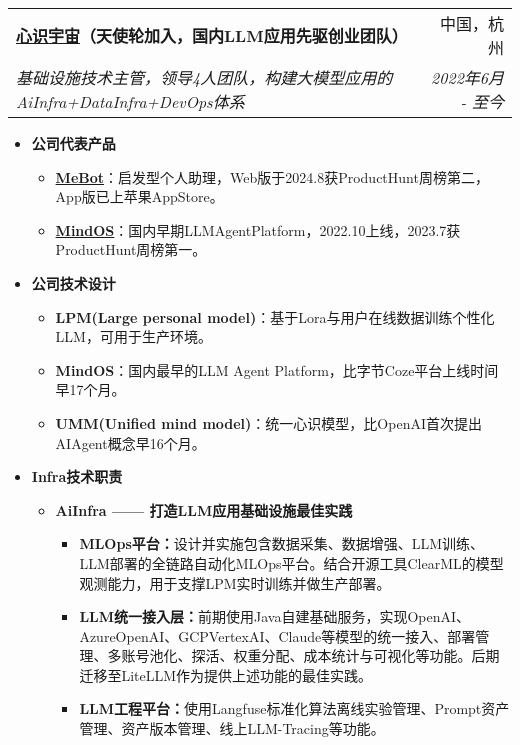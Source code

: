 \documentclass[letterpaper,11pt]{article}
\makeatletter
\newcommand{\resumeSubheading}[4]{
	\vspace{-1pt}\item
	\begin{tabular*}{0.97\textwidth}[t]{l@{\extracolsep{\fill}}r}
		\textbf{#1} & #2 \\
		\textit{\small#3} & \textit{\small #4} \\
	\end{tabular*}\vspace{-5pt}
}
\makeatother
\begin{document}
\begin{spacing}{0.9}
		\resumeSubheading
		{\href{https://home.mindos.com}{心识宇宙}（天使轮加入，国内LLM应用先驱创业团队）}{中国，杭州}
		{基础设施技术主管，领导4人团队，构建大模型应用的AiInfra+DataInfra+DevOps体系}{2022年6月 - 至今}
		\begin{itemize}
			\item \textbf{公司代表产品}
			\begin{itemize}
				\item \href{https://me.bot}{\textbf{MeBot}}：启发型个人助理，Web版于2024.8获ProductHunt周榜第二，App版已上苹果AppStore。
				\item \href{https://mindos.com}{\textbf{MindOS}}：国内早期LLMAgentPlatform，2022.10上线，2023.7获ProductHunt周榜第一。
			\end{itemize}
			\item \textbf{公司技术设计}
			\begin{itemize}
				\item {\textbf{LPM(Large personal model)}}：基于Lora与用户在线数据训练个性化LLM，可用于生产环境。
				\item {\textbf{MindOS}}：国内最早的LLM Agent Platform，比字节Coze平台上线时间早17个月。
			\item {\textbf{UMM(Unified mind model)}}：统一心识模型，比OpenAI首次提出AIAgent概念早16个月。
			\end{itemize}
						
			\item \textbf{Infra技术职责}
			\begin{itemize}
				\item \textbf{AiInfra —— 打造LLM应用基础设施最佳实践}
				\begin{itemize}
					\item \textbf{MLOps平台：}设计并实施包含数据采集、数据增强、LLM训练、LLM部署的全链路自动化MLOps平台。结合开源工具ClearML的模型观测能力，用于支撑LPM实时训练并做生产部署。
					\item \textbf{LLM统一接入层：}前期使用Java自建基础服务，实现OpenAI、AzureOpenAI、GCPVertexAI、Claude等模型的统一接入、部署管理、多账号池化、探活、权重分配、成本统计与可视化等功能。后期迁移至LiteLLM作为提供上述功能的最佳实践。
					\item \textbf{LLM工程平台：}使用Langfuse标准化算法离线实验管理、Prompt资产管理、资产版本管理、线上LLM-Tracing等功能。
				\end{itemize}
				

\end{itemize}
\end{itemize}
\end{spacing}
\end{document}
